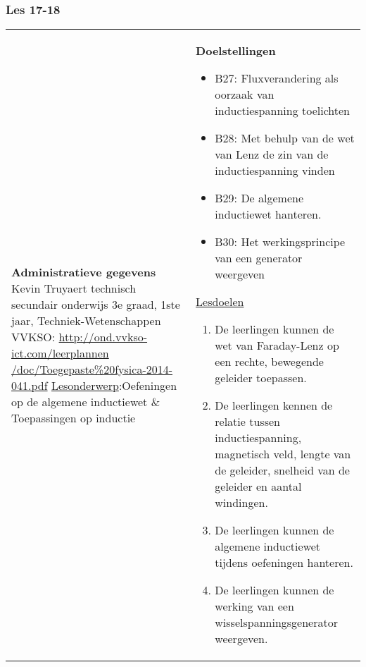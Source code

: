 


\begin{landscape}
	\subsubsection{Les 17-18}
	\begin{tabularx}{1.56\textwidth}{|p{}|X|}\hline
		\textbf{Administratieve gegevens}\newline\newline
		Kevin Truyaert\newline\newline
		technisch secundair onderwijs\newline
		3e graad, 1ste jaar, Techniek-Wetenschappen\newline
		VVKSO: \href{http://ond.vvkso-ict.com/leerplannen/doc/Toegepaste\%20fysica-2014-041.pdf}{http://ond.vvkso-ict.com/leerplannen /doc/Toegepaste\%20fysica-2014-041.pdf} \newline
		\underline{Lesonderwerp}:\newline Oefeningen op de algemene inductiewet \& Toepassingen op inductie & \textbf{Doelstellingen}
		\begin{itemize}[itemsep=0.08\baselineskip]
			\item B27: Fluxverandering als oorzaak van inductiespanning toelichten
			\item B28: Met behulp van de wet van Lenz de zin van de inductiespanning vinden
			\item B29: De algemene inductiewet hanteren.
			\item B30: Het werkingsprincipe van een generator weergeven
		\end{itemize}
		\underline{Lesdoelen}\newline
		\vspace{-0.75cm}
		\begin{enumerate}[itemsep=0.08\baselineskip]
			\item De leerlingen kunnen de wet van Faraday-Lenz op een rechte, bewegende geleider toepassen.
			\item De leerlingen kennen de relatie tussen inductiespanning, magnetisch veld, lengte van de geleider, snelheid van de geleider en aantal windingen.
			\item De leerlingen kunnen de algemene inductiewet tijdens oefeningen hanteren.
			\item De leerlingen kunnen de werking van een wisselspanningsgenerator weergeven.
			

\end{enumerate}
\end{tabularx}
\end{landscape}

